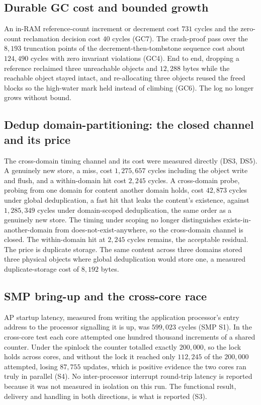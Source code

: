 \documentclass[10pt,twocolumn]{article}
\begin{document}
\subsection{Durable GC cost and bounded growth}

An in-RAM reference-count increment or decrement cost $731$ cycles and the
zero-count reclamation decision cost $40$ cycles (GC7). The crash-proof pass over
the $8{,}193$ truncation points of the decrement-then-tombstone sequence cost
about $124{,}490$ cycles with zero invariant violations (GC4). End to end,
dropping a reference reclaimed three unreachable objects and $12{,}288$ bytes
while the reachable object stayed intact, and re-allocating three objects reused
the freed blocks so the high-water mark held instead of climbing (GC6). The log
no longer grows without bound.

\subsection{Dedup domain-partitioning: the closed channel and its price}

The cross-domain timing channel and its cost were measured directly (DS3, DS5). A
genuinely new store, a miss, cost $1{,}275{,}657$ cycles including the object
write and flush, and a within-domain hit cost $2{,}245$ cycles. A cross-domain
probe, probing from one domain for content another domain holds, cost $42{,}873$
cycles under global deduplication, a fast hit that leaks the content's existence,
against $1{,}285{,}349$ cycles under domain-scoped deduplication, the same order
as a genuinely new store. The timing under scoping no longer distinguishes
exists-in-another-domain from does-not-exist-anywhere, so the cross-domain channel
is closed. The within-domain hit at $2{,}245$ cycles remains, the acceptable
residual. The price is duplicate storage. The same content across three domains
stored three physical objects where global deduplication would store one, a
measured duplicate-storage cost of $8{,}192$ bytes.

\subsection{SMP bring-up and the cross-core race}

AP startup latency, measured from writing the application processor's entry
address to the processor signalling it is up, was $599{,}023$ cycles (SMP S1). In
the cross-core test each core attempted one hundred thousand increments of a
shared counter. Under the spinlock the counter totalled exactly $200{,}000$, so
the lock holds across cores, and without the lock it reached only $112{,}245$ of
the $200{,}000$ attempted, losing $87{,}755$ updates, which is positive evidence
the two cores ran truly in parallel (S4). No inter-processor interrupt round-trip
latency is reported because it was not measured in isolation on this run. The
functional result, delivery and handling in both directions, is what is reported
(S3).
\end{document}
